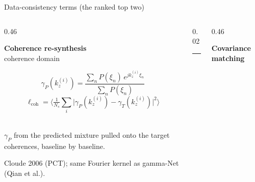 \begin{frame}{Data-consistency terms (the ranked top two)}
  \setlength{\abovedisplayskip}{3pt}
  \setlength{\belowdisplayskip}{3pt}
  \begin{columns}[T]
    \begin{column}{0.46\textwidth}
      \begin{minipage}[t][0.78\textheight][s]{\linewidth}
      \centering
      \textbf{Coherence re-synthesis}\\[1pt]
      {\footnotesize\color{soft} coherence domain}
      \par\vfill
      \[
        \gamma_P(k_z^{(i)}) = \frac{\sum_n P(\xi_n)\, e^{j k_z^{(i)} \xi_n}}{\sum_n P(\xi_n)}
      \]
      \[
        \ell_{\text{coh}} = \Big\langle \tfrac{1}{N_s}\textstyle\sum_i
          \big| \gamma_P(k_z^{(i)}) - \gamma_T(k_z^{(i)}) \big|^2 \Big\rangle
      \]
      \par\vfill
      \\[4pt]
      {\scriptsize \textcolor{accent}{$\gamma_P$ from the predicted mixture} pulled onto
       \textcolor{good}{the target coherences}, baseline by baseline.}
      \par\vfill
      {\footnotesize Cloude 2006 (PCT); same Fourier kernel as gamma-Net (Qian et al.).}
      \end{minipage}
    \end{column}
    \begin{column}{0.02\textwidth}
      \centering
      \textcolor{soft!40}{\rule{0.4pt}{0.74\textheight}}
    \end{column}
    \begin{column}{0.46\textwidth}
      \begin{minipage}[t][0.78\textheight][s]{\linewidth}
      \centering
      \textbf{Covariance matching}\\[1pt]

\end{minipage}
\end{column}
\end{columns}
\end{frame}
